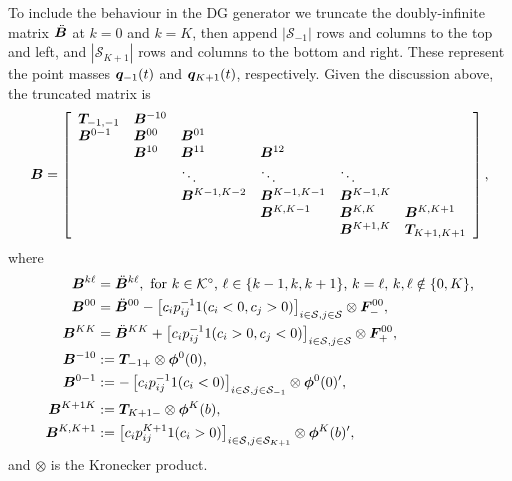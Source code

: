 To include the behaviour in the DG generator we truncate the doubly-infinite matrix \(\ddot{{\boldsymbol B}}\) at \(k=0\) and \(k=K\), then append \(|\mathcal S_{-1}|\) rows and columns to the top and left, and \(|\mathcal S_{K+1}|\) rows and columns to the bottom and right. These represent the point masses \(\boldsymbol q_{-1}(t)\) and \(\boldsymbol q_{K+1}(t)\), respectively. Given the discussion above, the truncated matrix is
\[{{\boldsymbol B}} = \left[\begin{array}{llllll}
	\boldsymbol T_{{-1},{-1}}& {{\boldsymbol B}}^{{-1}0} & & & & \\
	{{\boldsymbol B}}^{0{-1}} & {{\boldsymbol B}}^{00} & {{\boldsymbol B}}^{01} & & & \\
	& {{\boldsymbol B}}^{10} & {{\boldsymbol B}}^{11} & {{\boldsymbol B}}^{12} & & \\
	& & \ddots & \ddots & \ddots & \\
	& & {{\boldsymbol B}}^{K-1,K-2} &{{\boldsymbol B}}^{K-1,K-1} & {{\boldsymbol B}}^{K-1,K} & \\
	& & &{{\boldsymbol B}}^{K,K-1} & {{\boldsymbol B}}^{K,K} & {{\boldsymbol B}}^{K,{K+1}} \\
	& & & & {{\boldsymbol B}}^{{K+1}, K} & \boldsymbol T_{{K+1},{K+1}}
\end{array}\right],\]
where 
\begin{align*}
	{{\boldsymbol B}}^{k\ell} &= \ddot{{\boldsymbol B}}^{k\ell}, \mbox{ for \(k\in\mathcal K^\circ\), \(\ell\in\{k-1,k,k+1\}\), \(k=\ell,\, k,\ell\notin \{0,K\}\),}
	\\ \boldsymbol B^{00} &= \ddot{\boldsymbol B}^{00} - \left[c_ip_{ij}^{-1} 1(c_i<0, c_j>0)\right]_{i\in\mathcal{S},j\in\mathcal{S}}\otimes \boldsymbol F_-^{00},
	\\ \boldsymbol B^{KK} &= \ddot{\boldsymbol B}^{KK} + \left[c_ip_{ij}^{-1} 1(c_i>0, c_j<0)\right]_{i\in\mathcal{S},j\in\mathcal{S}}\otimes \boldsymbol F_+^{00}, 
	\\ {{\boldsymbol B}}^{{-1}0} &:= \boldsymbol T_{{-1}+}\otimes \boldsymbol\phi^0(0), 
	\\ {{\boldsymbol B}}^{0{-1}} &:=-\left[c_ip_{ij}^{-1} 1{(c_i<0)}\right]_{i\in\mathcal{S},j\in\mathcal{S}_{{-1}}} \otimes \boldsymbol \phi^0(0)'{}, 
	\\ {{\boldsymbol B}}^{{K+1} K} &:= \boldsymbol T_{{K+1}-}\otimes \boldsymbol\phi^K(b),
	\\ {{\boldsymbol B}}^{K,{K+1}} &:= \left[c_ip_{ij}^{K+1} 1{(c_i>0)}\right]_{i\in\mathcal{S},j\in\mathcal{S}_{K+1}} \otimes \boldsymbol \phi^K(b)'{},
\end{align*} 
and \(\otimes\) is the Kronecker product. 


